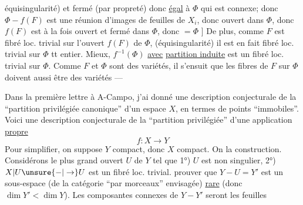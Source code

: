 équisingularité) et fermé (par propreté) donc \uline{égal} à $\Phi$ qui est connexe;  donc $\Phi-f(F)$ est une réunion d'images de feuilles  de $X_i$, donc ouvert dans $\Phi$, donc $f(F)$ est à la fois ouvert et fermé dans $\Phi$, donc $=\Phi$ ] De plus,  comme $F$ est fibré loc. trivial sur l'ouvert $f(F)$ de $\Phi$,  (équisingularité) il est en fait fibré loc. trivial sur $\Phi$ tt entier. Mieux, $f^{-1}(\Phi)$  \uline{avec}  \uline{partition induite} est un fibré loc. trivial sur $\Phi$. Comme $F$  et $\Phi$ sont des variétés, il s'ensuit que les fibres de $F$ sur $\Phi$ doivent aussi être des variétés ---

Dans la première lettre à A-Campo, j'ai donné une description conjecturale de la ``partition privilégiée canonique'' d'un espace $X$, en termes de points ``immobiles''. Voici une description conjecturale de la ``partition privilégiée'' d'une application \uline{propre} 
\[
f:X\to Y
\]
Pour simplifier, on suppose $Y$ compact, donc $X$ compact. On   la construction. Considérons le plus grand ouvert $U$ de $Y$ tel que 1°) $U$ est non singulier, 2°) $X|U\unsure{-|\to}U$ est un fibré loc. trivial.  prouver que $Y-U=Y'$ est un sous-espace (de la catégorie ``par morceaux'' envisagée) \uline{rare} (donc $\dim Y'<\dim Y$). Les composantes connexes de $Y-Y'$ seront les feuilles
